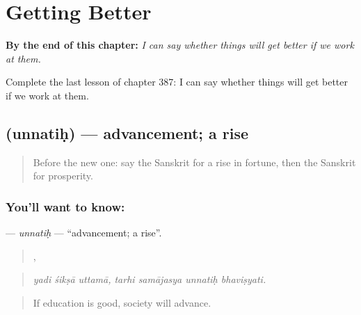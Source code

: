 
\chapter{Getting Better}
\label{ch:sa-getting-better}

\begin{chapteropening}
\textbf{By the end of this chapter:} \emph{I can say whether things will get better if we work at them.}

Complete the last lesson of chapter 387: I can say whether things will get better if we work at them.
\end{chapteropening}

\section[\texorpdfstring{\sk{उन्नतिः} (unnatiḥ)}{उन्नतिः (unnatiḥ)}]{ (unnatiḥ) — advancement; a rise}

\label{lesson:SA-C387-unnatih}



\begin{quote}
Before the new one: say the Sanskrit for a rise in fortune, then the Sanskrit for prosperity.
\end{quote}

\subsection*{You'll want to know: }
\textbf{} — \emph{unnatiḥ} — \textquotedblleft{}advancement; a rise\textquotedblright{}.

\begin{quote}
  ,    
\end{quote}

\begin{quote}
\emph{yadi śikṣā uttamā, tarhi samājasya unnatiḥ bhaviṣyati.}
\end{quote}

\begin{quote}
If education is good, society will advance.
\end{quote}

